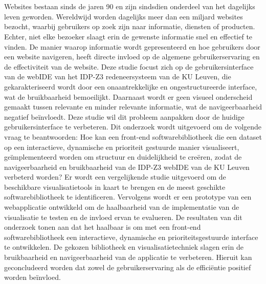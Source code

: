 
\chapter*{}
Websites bestaan sinds de jaren 90 en zijn sindsdien onderdeel van het dagelijks leven geworden. Wereldwijd worden dagelijks meer dan een miljard websites bezocht, waarbij gebruikers op zoek zijn naar informatie, diensten of producten. Echter, niet elke bezoeker slaagt erin de gewenste informatie snel en effectief te vinden. De manier waarop informatie wordt gepresenteerd en hoe gebruikers door een website navigeren, heeft directe invloed op de algemene gebruikerservaring en de effectiviteit van de website. Deze studie focust zich op de gebruikersinterface van de webIDE van het IDP-Z3 redeneersysteem van de KU Leuven, die gekarakteriseerd wordt door een onaantrekkelijke en ongestructureerde interface, wat de bruikbaarheid bemoeilijkt. Daarnaast wordt er geen visueel onderscheid gemaakt tussen relevante en minder relevante informatie, wat de navigeerbaarheid negatief beïnvloedt. Deze studie wil dit probleem aanpakken door de huidige gebruikersinterface te verbeteren. Dit onderzoek wordt uitgevoerd om de volgende vraag te beantwoorden: Hoe kan een front-end softwarebibliotheek die een dataset op een interactieve, dynamische en prioriteit gestuurde manier visualiseert, geïmplementeerd worden om structuur en duidelijkheid te creëren, zodat de navigeerbaarheid en bruikbaarheid van de IDP-Z3 webIDE van de KU Leuven verbeterd worden? Er wordt een vergelijkende studie uitgevoerd om de beschikbare visualisatietools in kaart te brengen en de meest geschikte softwarebibliotheek te identificeren. Vervolgens wordt er een prototype van een webapplicatie ontwikkeld om de haalbaarheid van de implementatie van de visualisatie te testen en de invloed ervan te evalueren. De resultaten van dit onderzoek tonen aan dat het haalbaar is om met een front-end softwarebibliotheek een interactieve, dynamische en prioriteitsgestuurde interface te ontwikkelen. De gekozen bibliotheek en visualisatietechniek slagen erin de bruikbaarheid en navigeerbaarheid van de applicatie te verbeteren. Hieruit kan geconcludeerd worden dat zowel de gebruikerservaring als de efficiëntie positief worden beïnvloed.